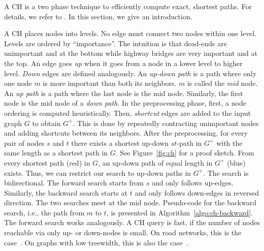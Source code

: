 \documentclass[a4paper,UKenglish,cleveref, autoref, thm-restate]{lipics-v2021}
\begin{document}
A CH is a two phase technique to efficiently compute exact, shortest paths.
For details, we refer to \cite{gssv-erlrn-12,dsw-cch-15}.
In this section, we give an introduction.

A CH places nodes into levels.
No edge must connect two nodes within one level.
Levels are ordered by ``importance''.
The intuition is that dead-ends are unimportant and at the bottom while highway bridges are very important and at the top.
An edge goes \emph{up} when it goes from a node in a lower level to higher level.
\emph{Down} edges are defined analogously.
An \emph{up-down path} is a path where only one node $m$ is more important than both its neighbors.
$m$ is called the \emph{mid} node.
An \emph{up path} is a path where the last node is the mid node.
Similarly, the first node is the mid node of a \emph{down path}.
%
In the preprocessing phase, first, a node ordering is computed heuristically.
Then, \emph{shortcut} edges are added to the input graph $G$ to obtain $G^+$.
This is done by repeatedly contracting unimportant nodes and adding shortcuts between its neighbors.
After the preprocessing, for every pair of nodes $s$ and $t$ there exists a shortest up-down $st$-path in $G^+$ with the same length as a shortest path in $G$.
See Figure~\ref{fig:ch} for a proof sketch.
From every shortest path (red) in $G$, an up-down path of equal length in $G^+$ (blue) exists.
Thus, we can restrict our search to up-down paths in $G^+$.
The search is bidirectional.
The forward search starts from $s$ and only follows up-edges.
Similarly, the backward search starts at $t$ and only follows down-edges in reversed direction.
The two searches meet at the mid node.
Pseudo-code for the backward search, i.e., the path from $m$ to $t$, is presented in Algorithm~\ref{algo:ch-backward}.
The forward search works analogously.
%
A CH query is fast, if the number of nodes reachable via only up- or down-nodes is small.
On road networks, this is the case~\cite{gssv-erlrn-12,dgpw-crprn-13}.
On graphs with low treewidth, this is also the case~\cite{dsw-cch-15,hs-gbpo-18}.

\end{document}
